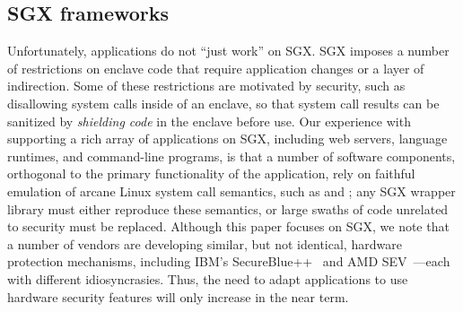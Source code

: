\begin{comment}
Unfortunately, the limited POSIX support in the \sdk{} infrastructure really strikes
the opportunity of fine-grained partitioning.
The lack of POSIX APIs in the infrastructure is fundamental, due to the restriction
on OS interaction from the enclaves.
The missing APIs encapsulates system calls, which can expose the enclave to some risky OS interaction model, such as {\bf Iago Attacks}~\cite{checkoway13iago}.


\end{comment}

\subsection{SGX frameworks}
\label{sec:sgx:background:design}





Unfortunately, applications do not ``just work'' on SGX.
SGX imposes a number of restrictions on enclave code 
that require application changes
or a layer of indirection. %
Some of these restrictions are motivated by security, such as disallowing system calls
inside of an enclave, so that system call results can be sanitized by {\em shielding code} in the enclave before use.
Our experience with supporting a rich array of applications on SGX, including web servers, language runtimes, and
command-line programs,
is that
a number of software components,
orthogonal to the primary functionality of the application,
rely on faithful emulation of arcane Linux system call semantics, such as  and ;
any SGX wrapper library must either reproduce these semantics, or large swaths of code unrelated to security
must be replaced.
Although this paper focuses on SGX, we note that a number of vendors are developing similar, but not identical,
hardware protection mechanisms, including IBM's SecureBlue++~\cite{secureblue++} and AMD SEV~\cite{amd-sme}---each
with different idiosyncrasies.
Thus, the need to adapt applications to use hardware security features
will only increase in the near term.

